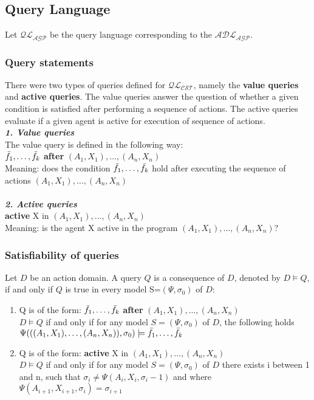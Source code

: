 \documentclass[a4paper]{article}
\begin{document}
\subsection{Query Language}
%
Let $\mathcal{QL_{AGP}}$ be the query language corresponding to the $\mathcal{ADL_{AGP}}$. 
%
\subsubsection{Query statements}
%
There were two types of queries defined for $\mathcal{QL_{CST}}$, namely the \textbf{value queries} and \textbf{active queries}. The value queries answer the question of whether a given condition is satisfied after performing a sequence of actions. The active queries evaluate if a given agent  is active for execution of sequence of actions.
\\[0.5\baselineskip]
\textbf{\textit{1. Value queries}}
\\[0.5\baselineskip]
The value query is defined in the following way:\\[0.5\baselineskip]
 $\Bar{f_1},\dotsc,\Bar{f_k}$ \textbf{after} $(A_1, X_1),\dotsc,(A_n, X_n)$ \\[0.5\baselineskip] 
Meaning: does the condition $\Bar{f_1},\dotsc,\Bar{f_k}$ hold after executing the sequence of actions $(A_1, X_1),\dotsc,(A_n, X_n)$
\\\\
\textbf{\textit{2. Active queries}}
\\[0.5\baselineskip]
\textbf{active} X in $(A_1, X_1),\dotsc,(A_n, X_n)$\\[0.5\baselineskip] 
Meaning: is the agent X active in the program $(A_1, X_1),\dotsc,(A_n, X_n)$?  \\[0.5\baselineskip]

\subsubsection{Satisfiability of queries}
Let $D$ be an action domain. A query $Q$ is a consequence of $D$, denoted by $D \models Q$, if and only if $Q$ is true in every model S=$(\Psi, \sigma_0)$ of $D$:
\begin{enumerate}
  \item Q is of the form: $\Bar{f_1},\dotsc,\Bar{f_k}$ \textbf{after} $(A_1, X_1),\dotsc,(A_n, X_n)$ \\[0.5\baselineskip] 
    $D \models Q$ if and only if for any model $S=(\Psi,\sigma_0)$ of $D$, 
   the following holds $\Psi(((A_1,X_1),\dotsc,(A_n,X_n)),\sigma_0)\models \Bar{f_1},\dotsc,\Bar{f_k}$ 
  \item Q is of the form: \textbf{active} X in $(A_1, X_1),\dotsc,(A_n, X_n)$\\[0.5\baselineskip] 
    $D \models Q$ if and only if for any model $S=(\Psi,\sigma_0)$ of $D$ 
    there exists i between 1 and n, such that $\sigma_i \neq \Psi(A_i, X_i, \sigma_i-1)$ and where $\Psi(A_{i+1}, X_{i+1}, \sigma_i) = \sigma_{i+1}$
\end{enumerate}
\end{document}
